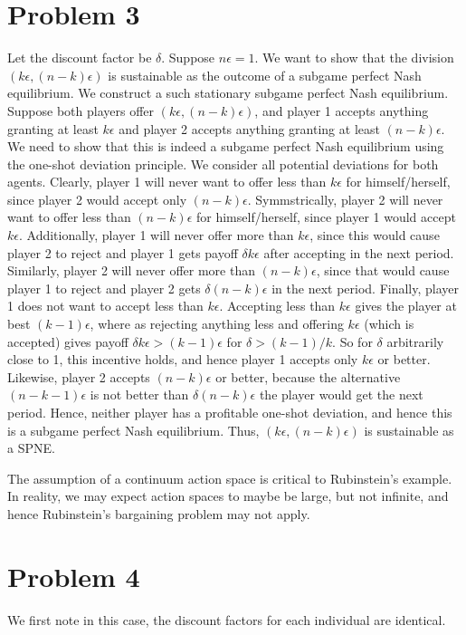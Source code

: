 \documentclass[10pt,letter]{article}
\begin{document}
\section*{Problem 3}
Let the discount factor be $\delta$. Suppose $n\epsilon = 1$. We want to show that the division $(k\epsilon, (n-k)\epsilon)$ is sustainable as the outcome of a subgame perfect Nash equilibrium. We construct a such stationary subgame perfect Nash equilibrium. Suppose both players offer $(k\epsilon, (n-k)\epsilon)$, and player 1 accepts anything granting at least $k\epsilon$ and player 2 accepts anything granting at least $(n-k)\epsilon$. We need to show that this is indeed a subgame perfect Nash equilibrium using the one-shot deviation principle. We consider all potential deviations for both agents. Clearly, player 1 will never want to offer less than $k\epsilon$ for himself/herself, since player 2 would accept only  $(n-k)\epsilon$. Symmstrically, player 2 will never want to offer less than $(n-k)\epsilon$ for himself/herself, since player 1 would accept $k\epsilon$. Additionally, player 1 will never offer more than $k\epsilon$, since this would cause player 2 to reject and player 1 gets payoff $\delta k\epsilon$ after accepting in the next period. Similarly, player 2 will never offer more than $(n-k)\epsilon$, since that would cause player 1 to reject and player 2 gets $\delta(n-k)\epsilon$ in the next period.
Finally, player 1 does not want to accept less than $k\epsilon$. Accepting less than $k\epsilon$ gives the player at best $(k-1)\epsilon$, where as rejecting anything less and offering $k\epsilon$ (which is accepted) gives payoff $\delta k\epsilon > (k-1)\epsilon$ for $\delta > (k-1)/k$. So for $\delta$ arbitrarily close to 1, this incentive holds, and hence player 1 accepts only $k\epsilon$ or better. Likewise, player 2 accepts $(n-k)\epsilon$ or better, because the alternative $(n-k-1)\epsilon$ is not better than $\delta(n-k)\epsilon$ the player would get the next period. Hence, neither player has a profitable one-shot deviation, and hence this is a subgame perfect Nash equilibrium. Thus, $(k\epsilon, (n-k)\epsilon)$ is sustainable as a SPNE.

The assumption of a continuum action space is critical to Rubinstein's example. In reality, we may expect action spaces to maybe be large, but not infinite, and hence Rubinstein's bargaining problem may not apply.

\section*{Problem 4}
We first note in this case, the discount factors for each individual are identical.
\end{document}
